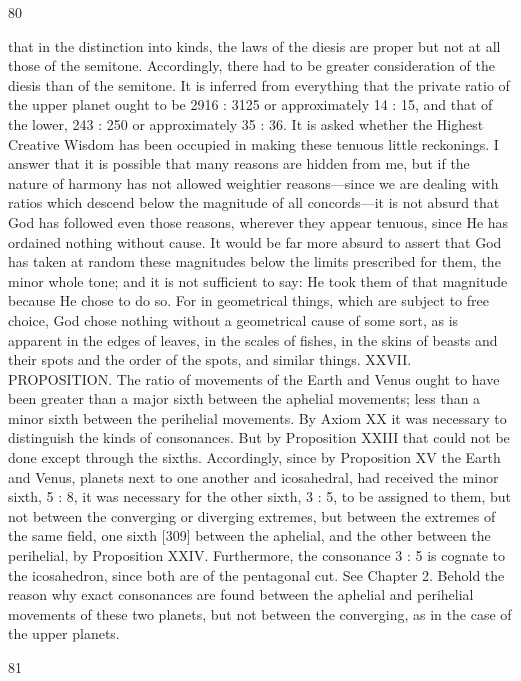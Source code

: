 \documentclass{article}
\begin{document}
80

that in the distinction into kinds, the laws of the diesis are proper but not
at all those of the semitone. Accordingly, there had to be greater
consideration of the diesis than of the semitone. It is inferred from
everything that the private ratio of the upper planet ought to be 2916 :
3125 or approximately 14 : 15, and that of the lower, 243 : 250 or
approximately 35 : 36.
It is asked whether the Highest Creative Wisdom has been occupied in
making these tenuous little reckonings. I answer that it is possible that
many reasons are hidden from me, but if the nature of harmony has not
allowed weightier reasons—since we are dealing with ratios which
descend below the magnitude of all concords—it is not absurd that God
has followed even those reasons, wherever they appear tenuous, since He
has ordained nothing without cause. It would be far more absurd to
assert that God has taken at random these magnitudes below the limits
prescribed for them, the minor whole tone; and it is not sufficient to say:
He took them of that magnitude because He chose to do so. For in
geometrical things, which are subject to free choice, God chose nothing
without a geometrical cause of some sort, as is apparent in the edges of
leaves, in the scales of fishes, in the skins of beasts and their spots and
the order of the spots, and similar things.
XXVII. PROPOSITION. The ratio of movements of the Earth and Venus
ought to have been greater than a major sixth between the aphelial
movements; less than a minor sixth between the perihelial movements.
By Axiom XX it was necessary to distinguish the kinds of consonances.
But by Proposition XXIII that could not be done except through the
sixths. Accordingly, since by Proposition XV the Earth and Venus,
planets next to one another and icosahedral, had received the minor
sixth, 5 : 8, it was necessary for the other sixth, 3 : 5, to be assigned to
them, but not between the converging or diverging extremes, but
between the extremes of the same field, one sixth [309] between the
aphelial, and the other between the perihelial, by Proposition XXIV.
Furthermore, the consonance 3 : 5 is cognate to the icosahedron, since
both are of the pentagonal cut. See Chapter 2.
Behold the reason why exact consonances are found between the aphelial
and perihelial movements of these two planets, but not between the
converging, as in the case of the upper planets.


81
\end{document}

